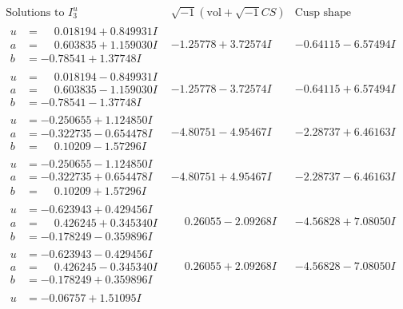 \documentclass[1p]{elsarticle_modified}
\theoremstyle{definition}
\newcommand{\I}{\sqrt{-1}}
\begin{document}
$$\begin{array}{c|c|c}  
\text{Solutions to }I^u_{3}& \I (\text{vol} + \sqrt{-1}CS) & \text{Cusp shape}\\
 \hline 
\begin{aligned}
u &= \phantom{-}0.018194 + 0.849931 I \\
a &= \phantom{-}0.603835 + 1.159030 I \\
b &= -0.78541 + 1.37748 I\end{aligned}
 & -1.25778 + 3.72574 I & -0.64115 - 6.57494 I \\ \hline\begin{aligned}
u &= \phantom{-}0.018194 - 0.849931 I \\
a &= \phantom{-}0.603835 - 1.159030 I \\
b &= -0.78541 - 1.37748 I\end{aligned}
 & -1.25778 - 3.72574 I & -0.64115 + 6.57494 I \\ \hline\begin{aligned}
u &= -0.250655 + 1.124850 I \\
a &= -0.322735 - 0.654478 I \\
b &= \phantom{-}0.10209 - 1.57296 I\end{aligned}
 & -4.80751 - 4.95467 I & -2.28737 + 6.46163 I \\ \hline\begin{aligned}
u &= -0.250655 - 1.124850 I \\
a &= -0.322735 + 0.654478 I \\
b &= \phantom{-}0.10209 + 1.57296 I\end{aligned}
 & -4.80751 + 4.95467 I & -2.28737 - 6.46163 I \\ \hline\begin{aligned}
u &= -0.623943 + 0.429456 I \\
a &= \phantom{-}0.426245 + 0.345340 I \\
b &= -0.178249 - 0.359896 I\end{aligned}
 & \phantom{-}0.26055 - 2.09268 I & -4.56828 + 7.08050 I \\ \hline\begin{aligned}
u &= -0.623943 - 0.429456 I \\
a &= \phantom{-}0.426245 - 0.345340 I \\
b &= -0.178249 + 0.359896 I\end{aligned}
 & \phantom{-}0.26055 + 2.09268 I & -4.56828 - 7.08050 I \\ \hline\begin{aligned}
u &= -0.06757 + 1.51095 I \\

\end{aligned}
\end{array}$$
\end{document}
